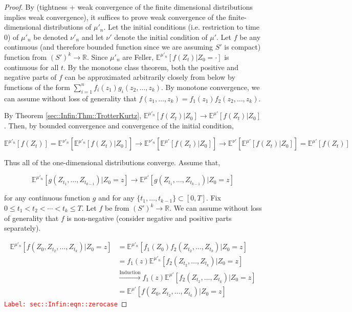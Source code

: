 \documentclass[12pt]{article}
\newcommand{\mb}{\mathbb}
\newcommand{\ra}{\rightarrow}
\newcommand{\os}{\overset}
\newcommand{\te}{\text}
\newcommand{\tr}{\textcolor{red}}
\newcommand{\labe}[1]{\tr{\texttt{Label: #1}}}
\newcommand{\ind}{\hspace{24pt}}
\newcommand{\exmu}[2]{\mb{E}^{#1}\left[#2\right]}	%
\begin{document}
\begin{proof}
By \cite[Theorem 13.1]{Bil99} (tightness + weak convergence of the finite dimensional distributions implies weak convergence), it suffices to prove weak convergence of the finite-dimensional distributions of \(\mu'_n\). Let the initial conditions (i.e. restriction to time 0) of \(\mu'_n\) be denoted \(\nu'_n\) and let \(\nu'\) denote the initial condition of \(\mu'\). Let \(f\) be any continuous (and therefore bounded function since we are assuming \(S'\) is compact) function from \((S')^k\ra\mb{R}\). Since \(\mu'_n\) are Feller, \(\exmu{\mu'_n}{f(Z_t)|Z_0 = \cdot}\) is continuous for all \(t\). By the monotone class theorem, both the positive and negative parts of \(f\) can be approximated arbitrarily closely from below by functions of the form \(\sum_{i=1}^n f_i(z_1)g_i(z_2,\dots,z_k)\). By monotone convergence, we can assume without loss of generality that \(f(z_1,\dots,z_k) = f_1(z_1)f_2(z_2,\dots,z_k)\).

\ind By Theorem \ref{sec::Infin:Thm::TrotterKurtz}, \(\exmu{\mu'_n}{f(Z_t)|Z_0} \ra \exmu{\mu'}{f(Z_t)|Z_0}\). Then, by bounded convergence and convergence of the initial condition,

\[\exmu{\mu'_n}{f(Z_t)}  = \exmu{\nu'_n}{\exmu{\mu'_n}{f(Z_t)|Z_0}} \ra \exmu{\nu'_n}{\exmu{\mu'}{f(Z_t)|Z_0}} \ra \exmu{\nu'}{\exmu{\mu'}{f(Z_t)|Z_0}} = \exmu{\mu'}{f(Z_t)}\]

Thus all of the one-dimensional distributions converge. Assume that,

\[\exmu{\mu'_n}{g(Z_{t_1},\dots,Z_{t_{k-1}})|Z_0=z} \ra \exmu{\mu'}{g(Z_{t_1},\dots,Z_{t_{k-1}})|Z_0=z}\]

\noindent for any continuous function \(g\) and for any \(\{t_1,\dots,t_{k-1}\} \subset [0,T]\). Fix \(0\leq t_1 <t_2 <\cdots < t_k\leq T\). Let \(f\) be from \((S')^k \ra \mb{R}\). We can assume without loss of generality that \(f\) is non-negative (consider negative and positive parts separately).

\begin{align}
\exmu{\mu'_n}{f(Z_{0},Z_{t_2},\dots,Z_{t_k})|Z_0 = z}&= \exmu{\mu'_n}{f_1(Z_{0})f_2(Z_{t_2},\dots,Z_{t_{k}})|Z_0=z}\nonumber\\
&= f_1(z)\exmu{\mu'_n}{f_2(Z_{t_2},\dots,Z_{t_{k}})|Z_0=z}\nonumber\\
&\os{\te{Induction}}{\ra} f_1(z)\exmu{\mu'}{f_2(Z_{t_2},\dots,Z_{t_{k}})|Z_0=z}\nonumber\\
&= \exmu{\mu'}{f(Z_0,Z_{t_2},\dots,Z_{t_k})|Z_0=z}
\label{sec::Infin:eqn::zerocase}
\end{align}
\labe{sec::Infin:eqn::zerocase}


\end{proof}
\end{document}
